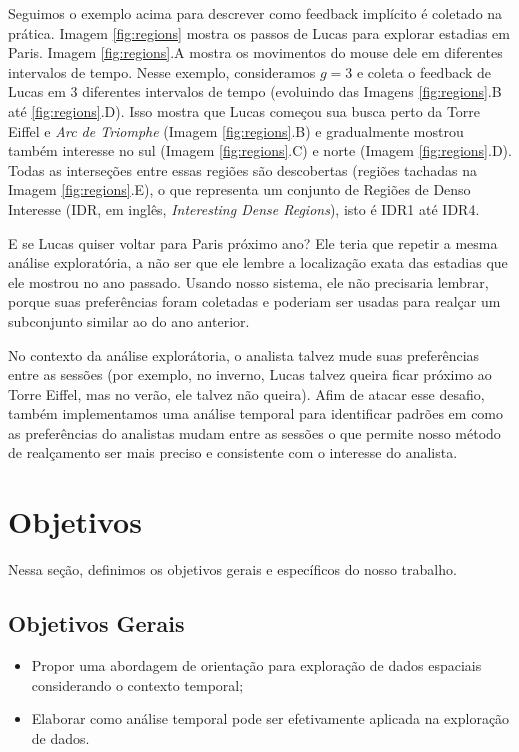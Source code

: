 Seguimos o exemplo acima para descrever como feedback implícito é coletado na prática. Imagem \ref{fig:regions} mostra os passos de Lucas para explorar estadias em Paris. Imagem \ref{fig:regions}.A mostra os movimentos do mouse dele em diferentes intervalos de tempo. Nesse exemplo, consideramos $g = 3$ e coleta o feedback de Lucas em 3 diferentes intervalos de tempo (evoluindo das Imagens \ref{fig:regions}.B até \ref{fig:regions}.D). Isso mostra que Lucas começou sua busca perto da Torre Eiffel e {\em Arc de Triomphe} (Imagem \ref{fig:regions}.B) e gradualmente mostrou também interesse no sul (Imagem \ref{fig:regions}.C) e norte (Imagem \ref{fig:regions}.D). Todas as interseções entre essas regiões são descobertas (regiões tachadas na Imagem \ref{fig:regions}.E), o que representa um conjunto de Regiões de Denso Interesse (IDR, em inglês, {\em Interesting Dense Regions}), isto é IDR1 até IDR4.

E se Lucas quiser voltar para Paris próximo ano? Ele teria que repetir a mesma análise exploratória, a não ser que ele lembre a localização exata das estadias que ele mostrou no ano passado. Usando nosso sistema, ele não precisaria lembrar, porque suas preferências foram coletadas e poderiam ser usadas para realçar um subconjunto similar ao do ano anterior.

No contexto da análise explorátoria, o analista talvez mude suas preferências entre as sessões (por exemplo, no inverno, Lucas talvez queira ficar próximo ao Torre Eiffel, mas no verão, ele talvez não queira). Afim de atacar esse desafio, também implementamos uma análise temporal para identificar padrões em como as preferências do analistas mudam entre as sessões o que permite nosso método de realçamento ser mais preciso e consistente com o interesse do analista.

\section{Objetivos}

Nessa seção, definimos os objetivos gerais e específicos do nosso trabalho.

\subsection{Objetivos Gerais}

\begin{itemize}
	\item Propor uma abordagem de orientação para exploração de dados espaciais considerando o contexto temporal;
	\item Elaborar como análise temporal pode ser efetivamente aplicada na exploração de dados.
\end{itemize}

